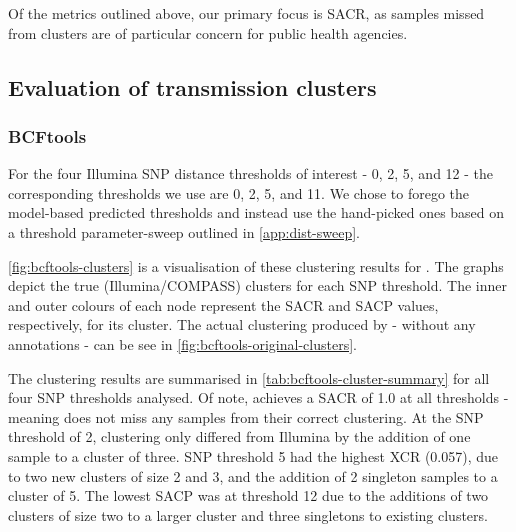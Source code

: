 Of the metrics outlined above, our primary focus is SACR, as samples missed from clusters are of particular concern for public health agencies.

\subsection{Evaluation of transmission clusters}
\label{sec:eval-clusters}

\subsubsection{BCFtools}
\label{sec:bcftools-clustering}

For the four Illumina SNP distance thresholds of interest - 0, 2, 5, and 12 - the corresponding \bcftools{} thresholds we use are 0, 2, 5, and 11. We chose to forego the model-based predicted thresholds and instead use the hand-picked ones based on a threshold parameter-sweep outlined in \autoref{app:dist-sweep}.

\autoref{fig:bcftools-clusters} is a visualisation of these clustering results for \bcftools{}. The graphs depict the true (Illumina/COMPASS) clusters for each SNP threshold. The inner and outer colours of each node represent the SACR and SACP values, respectively, for its cluster. The actual clustering produced by \bcftools{} - without any annotations - can be see in \autoref{fig:bcftools-original-clusters}.

The \bcftools{} clustering results are summarised in \autoref{tab:bcftools-cluster-summary} for all four SNP thresholds analysed. Of note, \bcftools{} achieves a SACR of 1.0 at all thresholds - meaning \ont{} does not miss any samples from their correct clustering. At the SNP threshold of 2, \bcftools{} clustering only differed from Illumina by the addition of one sample to a cluster of three.  SNP threshold 5 had the highest XCR (0.057), due to two new clusters of size 2 and 3, and the addition of 2 singleton samples to a cluster of 5.  The lowest SACP was at threshold 12 due to the additions of two clusters of size two to a larger cluster and three singletons to existing clusters. 

